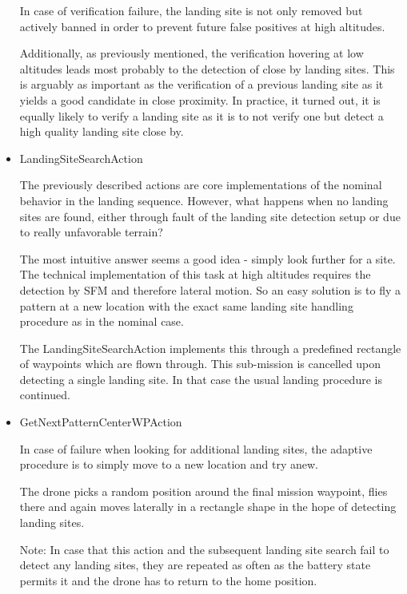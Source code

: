 \begin{itemize}
    In case of verification failure, the landing site is not only removed but actively banned in order to prevent future false positives at high altitudes.

    Additionally, as previously mentioned, the verification hovering at low altitudes leads most probably to the detection of close by landing sites. This is arguably as important as the verification of a previous landing site as it yields a good candidate in close proximity. In practice, it turned out,  it is equally likely to verify a landing site as it is to not verify one but detect a high quality landing site close by.
    \item LandingSiteSearchAction

    The previously described actions are core implementations of the nominal behavior in the landing sequence. However, what happens when no landing sites are found, either through fault of the landing site detection setup or due to really unfavorable terrain?

    The most intuitive answer seems a good idea - simply look further for a site. The technical implementation of this task at high altitudes requires the detection by SFM and therefore lateral motion. So an easy solution is to fly a pattern at a new location with the exact same landing site handling procedure as in the nominal case.

    The LandingSiteSearchAction implements this through a predefined rectangle of waypoints which are flown through. This sub-mission is cancelled upon detecting a single landing site. In that case the usual landing procedure is continued.
    \item GetNextPatternCenterWPAction

    In case of failure when looking for additional landing sites, the adaptive procedure is to simply move to a new location and try anew. 

    The drone picks a random position around the final mission waypoint, flies there and again moves laterally in a rectangle shape in the hope of detecting landing sites.

    Note: In case that this action and the subsequent landing site search fail to detect any landing sites, they are repeated as often as the battery state permits it and the drone has to return to the home position.
    \end{itemize}

